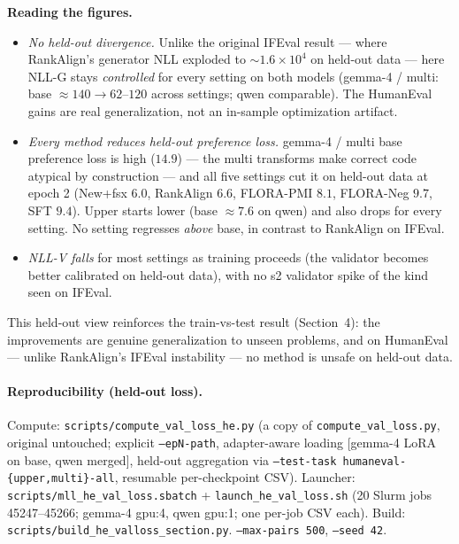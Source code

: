 \documentclass[11pt,a4paper]{article}
\begin{document}
\textbf{Reading the figures.}
\begin{itemize}
\item \emph{No held-out divergence.} Unlike the original IFEval result --- where RankAlign's
generator NLL exploded to $\sim$$1.6\times10^4$ on held-out data --- here NLL-G stays
\emph{controlled} for every setting on both models (gemma-4 / multi: base $\approx140 \to
62$--$120$ across settings; qwen comparable). The HumanEval gains are real generalization, not an
in-sample optimization artifact.
\item \emph{Every method reduces held-out preference loss.} gemma-4 / multi base preference loss
is high ($14.9$) --- the multi transforms make correct code atypical by construction --- and all
five settings cut it on held-out data at epoch 2 (New+fsx $6.0$, RankAlign $6.6$, FLORA-PMI
$8.1$, FLORA-Neg $9.7$, SFT $9.4$). Upper starts lower (base $\approx7.6$ on qwen) and also drops
for every setting. No setting regresses \emph{above} base, in contrast to RankAlign on IFEval.
\item \emph{NLL-V falls} for most settings as training proceeds (the validator becomes better
calibrated on held-out data), with no s2 validator spike of the kind seen on IFEval.
\end{itemize}

This held-out view reinforces the train-vs-test result (Section~4): the improvements are
genuine generalization to unseen problems, and on HumanEval --- unlike RankAlign's IFEval
instability --- no method is unsafe on held-out data.

\begin{table}[H]\centering\footnotesize
\caption{Held-out test loss across checkpoints, gemma-4-31b (all 10 cells $\times$ base/ep0/ep1/ep2).
Base is the shared untrained reference within each dataset.}
\label{tab:he_valloss_gemma}

\end{table}

\begin{table}[H]\centering\footnotesize
\caption{Held-out test loss across checkpoints, qwen-3.5-9b (all 10 cells $\times$ base/ep0/ep1/ep2).}
\label{tab:he_valloss_qwen}

\end{table}

\paragraph{Reproducibility (held-out loss).} Compute: \texttt{scripts/compute\_val\_loss\_he.py}
(a copy of \texttt{compute\_val\_loss.py}, original untouched; explicit \texttt{--epN-path},
adapter-aware loading [gemma-4 LoRA on base, qwen merged], held-out aggregation via
\texttt{--test-task humaneval-\{upper,multi\}-all}, resumable per-checkpoint CSV). Launcher:
\texttt{scripts/mll\_he\_val\_loss.sbatch} + \texttt{launch\_he\_val\_loss.sh} (20 Slurm jobs
45247--45266; gemma-4 gpu:4, qwen gpu:1; one per-job CSV each). Build:
\texttt{scripts/build\_he\_valloss\_section.py}. \texttt{--max-pairs 500}, \texttt{--seed 42}.
\end{document}
